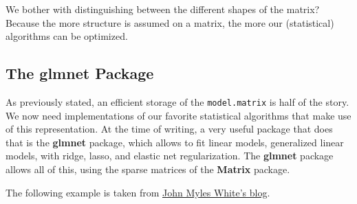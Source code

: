 \documentclass[]{book}
\theoremstyle{definition}
\theoremstyle{definition}
\theoremstyle{remark}
\begin{document}
We bother with distinguishing between the different shapes of the
matrix? Because the more structure is assumed on a matrix, the more our
(statistical) algorithms can be optimized.

\subsection{The glmnet Package}\label{the-glmnet-package}

As previously stated, an efficient storage of the \texttt{model.matrix}
is half of the story. We now need implementations of our favorite
statistical algorithms that make use of this representation. At the time
of writing, a very useful package that does that is the \textbf{glmnet}
package, which allows to fit linear models, generalized linear models,
with ridge, lasso, and elastic net regularization. The \textbf{glmnet}
package allows all of this, using the sparse matrices of the
\textbf{Matrix} package.

The following example is taken from
\href{http://www.johnmyleswhite.com/notebook/2011/10/31/using-sparse-matrices-in-r/}{John
Myles White's blog}.
\end{document}
